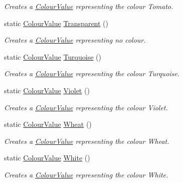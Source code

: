 \begin{DoxyCompactItemize}
\begin{DoxyCompactList}\small\item\em Creates a \hyperlink{classMezzanine_1_1ColourValue}{ColourValue} representing the colour Tomato. \item\end{DoxyCompactList}\item 
static \hyperlink{classMezzanine_1_1ColourValue}{ColourValue} \hyperlink{classMezzanine_1_1ColourValue_ade119745c9a6bf14bbe188356891baa4}{Transparent} ()
\begin{DoxyCompactList}\small\item\em Creates a \hyperlink{classMezzanine_1_1ColourValue}{ColourValue} representing no colour. \item\end{DoxyCompactList}\item 
static \hyperlink{classMezzanine_1_1ColourValue}{ColourValue} \hyperlink{classMezzanine_1_1ColourValue_addff72e03f5fe75608a014d3f0e9be3f}{Turquoise} ()
\begin{DoxyCompactList}\small\item\em Creates a \hyperlink{classMezzanine_1_1ColourValue}{ColourValue} representing the colour Turquoise. \item\end{DoxyCompactList}\item 
static \hyperlink{classMezzanine_1_1ColourValue}{ColourValue} \hyperlink{classMezzanine_1_1ColourValue_a19bfa31b107882f051250e278516e488}{Violet} ()
\begin{DoxyCompactList}\small\item\em Creates a \hyperlink{classMezzanine_1_1ColourValue}{ColourValue} representing the colour Violet. \item\end{DoxyCompactList}\item 
static \hyperlink{classMezzanine_1_1ColourValue}{ColourValue} \hyperlink{classMezzanine_1_1ColourValue_a0ad7918b6f69c335d5342fbe17ecade0}{Wheat} ()
\begin{DoxyCompactList}\small\item\em Creates a \hyperlink{classMezzanine_1_1ColourValue}{ColourValue} representing the colour Wheat. \item\end{DoxyCompactList}\item 
static \hyperlink{classMezzanine_1_1ColourValue}{ColourValue} \hyperlink{classMezzanine_1_1ColourValue_a68cd34992e473676b9cf40a5f7ef75c3}{White} ()
\begin{DoxyCompactList}\small\item\em Creates a \hyperlink{classMezzanine_1_1ColourValue}{ColourValue} representing the colour White. \item\end{DoxyCompactList}\item 

\end{DoxyCompactItemize}
